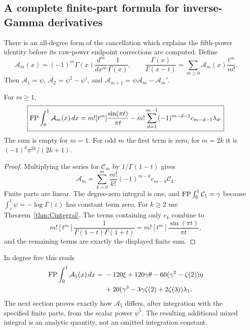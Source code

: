 \subsection{A complete finite-part formula for inverse-Gamma derivatives}

There is an all-degree form of the cancellation which explains the
fifth-power identity before its raw-power endpoint corrections are
computed. Define
\begin{equation}\label{eq:Adefinition}
 \mathcal A_m(x)=(-1)^m\Gamma(x)\frac{d^m}{dx^m}\frac1{\Gamma(x)},
 \qquad
 \frac{\Gamma(x)}{\Gamma(x-t)}
       =\sum_{m\ge0}\mathcal A_m(x)\frac{t^m}{m!}.
\end{equation}
Then $\mathcal A_1=\psi$, $\mathcal A_2=\psi^2-\psi'$, and
$\mathcal A_{m+1}=\psi\mathcal A_m-\mathcal A_m'$.

\begin{corollary}
\label{cor:Aintegrals}
For $m\ge1$,
\begin{equation}\label{eq:Aintegrals}
 \boxed{\displaystyle
 \operatorname{FP}\int_0^1\mathcal A_m(x)\,dx
 =m![t^m]\frac{\sin(\pi t)}{\pi t}
   -m!\sum_{d=1}^{m-1}(-1)^{m-d-1}c_{m-d-1}\lambda_d.}
\end{equation}
The sum is empty for $m=1$. For odd $m$ the first term is zero;
for $m=2k$ it is $(-1)^k\pi^{2k}/(2k+1)$.
\end{corollary}
\begin{proof}
Multiplying the series for $\mathcal C_m$ by $1/\Gamma(1-t)$ gives
\[
 \mathcal A_m=\sum_{k=0}^m\frac{m!}{k!}
                         (-1)^{m-k}c_{m-k}\mathcal C_k.
\]
Finite parts are linear. The degree-zero integral is one, and
$\operatorname{FP}\int_0^1\mathcal C_1=\gamma$ because
$\int_\varepsilon^1\psi=-\log\Gamma(\varepsilon)$ has constant
term zero. For $k\ge2$ use Theorem~\ref{thm:Cintegral}.
The terms containing only $c_k$ combine to
\[
 m![t^m]\frac1{\Gamma(1-t)\Gamma(1+t)}
     =m![t^m]\frac{\sin(\pi t)}{\pi t},
\]
and the remaining terms are exactly the displayed finite sum.
\end{proof}

In degree five this reads
\begin{equation}\label{eq:A5height}
 \begin{aligned}
 \operatorname{FP}\int_0^1\mathcal A_5(x)\,dx
   ={}&-120\xi+120\gamma\theta
      -60(\gamma^2-\zeta(2))\eta\\
      &+20(\gamma^3-3\gamma\zeta(2)+2\zeta(3))\lambda_1.
 \end{aligned}
\end{equation}
The next section proves exactly how $\mathcal A_5$ differs, after
integration with the specified finite parts, from the scalar power
$\psi^5$. The resulting additional mixed integral is an analytic
quantity, not an omitted integration constant.
